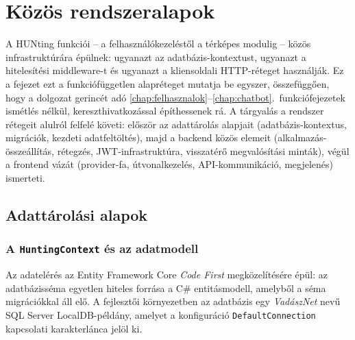 
\chapter{Közös rendszeralapok}
\label{chap:alapok}

A HUNting funkciói -- a felhasználókezeléstől a térképes modulig -- közös infrastruktúrára
épülnek: ugyanazt az adatbázis-kontextust, ugyanazt a hitelesítési middleware-t és ugyanazt a
kliensoldali HTTP-réteget használják. Ez a fejezet ezt a funkciófüggetlen alapréteget mutatja be
egyszer, összefüggően, hogy a dolgozat gerincét adó
\ref{chap:felhasznalok}--\ref{chap:chatbot}.~funkciófejezetek ismétlés nélkül, kereszthivatkozással
építhessenek rá. A tárgyalás a rendszer rétegeit alulról felfelé követi: először az adattárolás
alapjait (adatbázis-kontextus, migrációk, kezdeti adatfeltöltés), majd a backend közös elemeit
(alkalmazás-összeállítás, rétegzés, JWT-infrastruktúra, visszatérő megvalósítási minták), végül a
frontend vázát (provider-fa, útvonalkezelés, API-kommunikáció, megjelenés) ismerteti.

\section{Adattárolási alapok}
\label{sec:alapok-adat}

\subsection{A \texttt{HuntingContext} és az adatmodell}

Az adatelérés az Entity Framework Core \emph{Code First} megközelítésére épül: az adatbázisséma
egyetlen hiteles forrása a C\# entitásmodell, amelyből a séma migrációkkal áll elő. A fejlesztői
környezetben az adatbázis egy \emph{VadászNet} nevű SQL Server LocalDB-példány, amelyet a
konfiguráció \texttt{DefaultConnection} kapcsolati karakterlánca jelöl ki.


